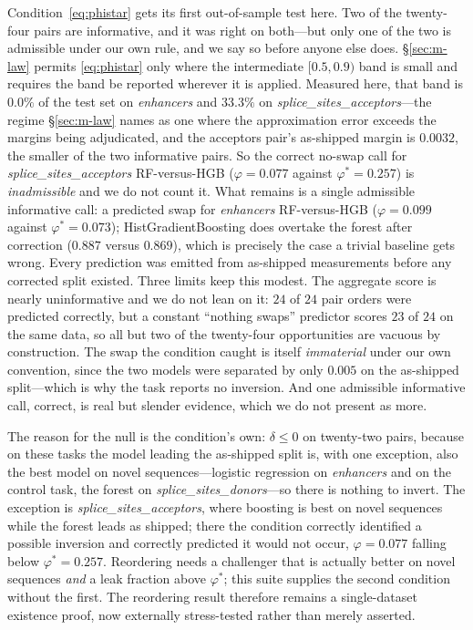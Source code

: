 \documentclass[webpdf,modern,large,namedate]{oup-authoring-template}%
\begin{document}
Condition~\eqref{eq:phistar} gets its first out-of-sample test here. Two of the twenty-four pairs are informative, and it was right on both---but only one of the two is admissible under our own rule, and we say so before anyone else does. \S\ref{sec:m-law} permits \eqref{eq:phistar} only where the intermediate $[0.5,0.9)$ band is small and requires the band be reported wherever it is applied. Measured here, that band is $0.0\%$ of the test set on \textit{enhancers} and $33.3\%$ on \textit{splice\_sites\_acceptors}---the regime \S\ref{sec:m-law} names as one where the approximation error exceeds the margins being adjudicated, and the acceptors pair's as-shipped margin is $0.0032$, the smaller of the two informative pairs. So the correct no-swap call for \textit{splice\_sites\_acceptors} RF-versus-HGB ($\varphi=0.077$ against $\varphi^{*}=0.257$) is \emph{inadmissible} and we do not count it. What remains is a single admissible informative call: a predicted swap for \textit{enhancers} RF-versus-HGB ($\varphi=0.099$ against $\varphi^{*}=0.073$); HistGradientBoosting does overtake the forest after correction ($0.887$ versus $0.869$), which is precisely the case a trivial baseline gets wrong. Every prediction was emitted from as-shipped measurements before any corrected split existed. Three limits keep this modest. The aggregate score is nearly uninformative and we do not lean on it: $24$ of $24$ pair orders were predicted correctly, but a constant ``nothing swaps'' predictor scores $23$ of $24$ on the same data, so all but two of the twenty-four opportunities are vacuous by construction. The swap the condition caught is itself \emph{immaterial} under our own convention, since the two models were separated by only $0.005$ on the as-shipped split---which is why the task reports no inversion. And one admissible informative call, correct, is real but slender evidence, which we do not present as more.

The reason for the null is the condition's own: $\delta\le0$ on twenty-two pairs, because on these tasks the model leading the as-shipped split is, with one exception, also the best model on novel sequences---logistic regression on \textit{enhancers} and on the control task, the forest on \textit{splice\_sites\_donors}---so there is nothing to invert. The exception is \textit{splice\_sites\_acceptors}, where boosting is best on novel sequences while the forest leads as shipped; there the condition correctly identified a possible inversion and correctly predicted it would not occur, $\varphi=0.077$ falling below $\varphi^{*}=0.257$. Reordering needs a challenger that is actually better on novel sequences \emph{and} a leak fraction above $\varphi^{*}$; this suite supplies the second condition without the first. The reordering result therefore remains a single-dataset existence proof, now externally stress-tested rather than merely asserted.
\end{document}

